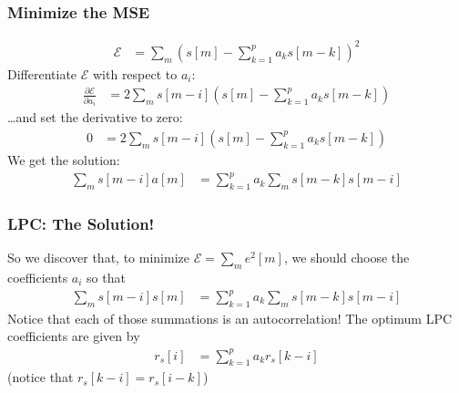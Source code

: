 \documentclass{beamer}
\begin{document}
\begin{frame}
  \frametitle{Minimize the MSE}

  \begin{align*}
    \mathcal{E} &= \sum_m \left(s[m]-\sum_{k=1}^p a_ks[m-k]\right)^2
  \end{align*}
  Differentiate $\mathcal{E}$ with respect to $a_i$:
  \begin{align*}
    \frac{\partial \mathcal{E}}{\partial a_i} 
    &= 2\sum_m s[m-i]\left(s[m]-\sum_{k=1}^p a_ks[m-k]\right)
  \end{align*}
  \ldots and set the derivative to zero:
  \begin{align*}
    0 &= 2\sum_m s[m-i]\left(s[m]-\sum_{k=1}^p a_ks[m-k]\right)
  \end{align*}
  We get the solution:
  \begin{align*}
    \sum_m s[m-i]a[m] &= \sum_{k=1}^p a_k \sum_m s[m-k]s[m-i]
  \end{align*}
\end{frame}

\begin{frame}
  \frametitle{LPC: The Solution!}

  So we discover that, to minimize $\mathcal{E}=\sum_me^2[m]$, we
  should choose the coefficients $a_i$ so that
  \begin{align*}
    \sum_m s[m-i]s[m] &= \sum_{k=1}^p a_k\sum_m s[m-k]s[m-i]
  \end{align*}
  Notice that each of those summations is an autocorrelation!  The
  optimum LPC coefficients are given by
  \begin{align*}
    r_s[i] &= \sum_{k=1}^p a_kr_s[k-i]
  \end{align*}
  (notice that $r_s[k-i]=r_s[i-k]$)
\end{frame}
\end{document}
